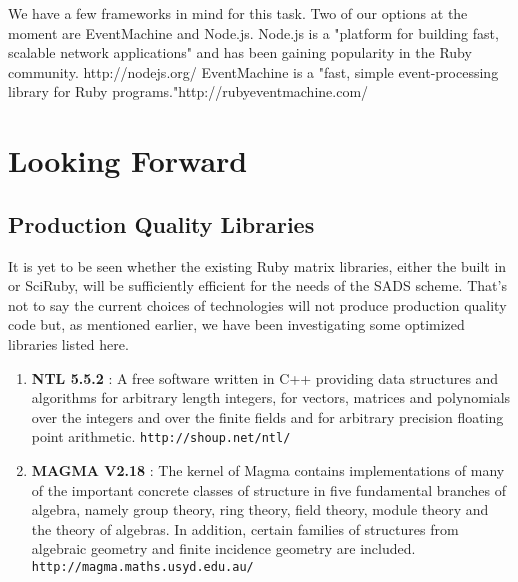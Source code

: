 \documentclass[11pt, letterpaper, oneside]{article}
\begin{document}
	We have a few frameworks in mind for this task.
	Two of our options at the moment are EventMachine and Node.js.
	Node.js is a "platform for building fast, scalable network applications" and has been gaining popularity in the Ruby community. http://nodejs.org/
	EventMachine is a "fast, simple event-processing library for Ruby programs."http://rubyeventmachine.com/





\section{Looking Forward}

	\subsection{Production Quality Libraries}
	It is yet to be seen whether the existing Ruby matrix libraries, either the built in or SciRuby, will be sufficiently efficient for the needs of the SADS scheme.
	That's not to say the current choices of technologies will not produce production quality code but, as mentioned earlier, we have been investigating some optimized libraries listed here.

	\begin{enumerate}
	\item \textbf{NTL 5.5.2} : A free software written in C++ providing data structures and algorithms for arbitrary length integers, for vectors, matrices and polynomials over the integers and over the finite fields and for arbitrary precision floating point arithmetic. \texttt{http://shoup.net/ntl/}
	\item \textbf{MAGMA V2.18} : The kernel of Magma contains implementations of many of the important concrete classes of structure in five fundamental branches of algebra, namely group theory, ring theory, field theory, module theory and the theory of algebras.
	In addition, certain families of structures from algebraic geometry and finite incidence geometry are included. \texttt{http://magma.maths.usyd.edu.au/}
	\end{enumerate}
\end{document}
